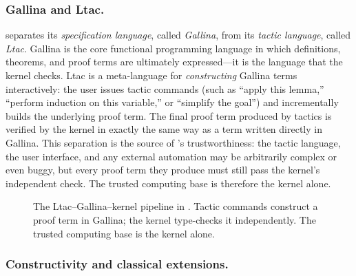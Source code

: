 \subsubsection*{Gallina and Ltac.}

\Rocq{} separates its \emph{specification language}, called
\emph{Gallina}, from its \emph{tactic language}, called \emph{Ltac}.
Gallina is the core functional programming language in which definitions,
theorems, and proof terms are ultimately expressed---it is the language
that the kernel checks.  Ltac is a meta-language for \emph{constructing}
Gallina terms interactively: the user issues tactic commands (such as
``apply this lemma,'' ``perform induction on this variable,'' or
``simplify the goal'') and \Rocq{} incrementally builds the underlying
proof term.  The final proof term produced by tactics is verified by the
kernel in exactly the same way as a term written directly in Gallina.
This separation is the source of \Rocq{}'s trustworthiness: the tactic
language, the user interface, and any external automation may be
arbitrarily complex or even buggy, but every proof term they produce must
still pass the kernel's independent check.  The trusted computing base
is therefore the kernel alone.

\begin{figure}[h]
\centering
{}
\caption{The Ltac--Gallina--kernel pipeline in \Rocq{}.  Tactic commands
  construct a proof term in Gallina; the kernel type-checks it
  independently.  The trusted computing base is the kernel alone.}
\label{fig:ltac-gallina}
\end{figure}

\subsubsection*{Constructivity and classical extensions.}

